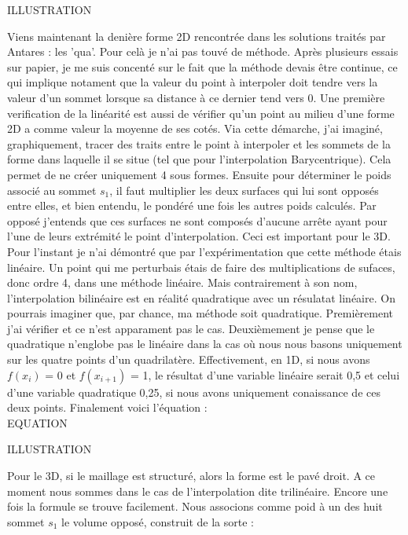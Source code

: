 ILLUSTRATION

Viens maintenant la denière forme 2D rencontrée dans les solutions traités par Antares : les 'qua'. Pour celà je n'ai pas touvé de méthode. Après plusieurs essais sur papier, je me suis concenté sur le fait que la méthode devais être continue, ce qui implique notament que la valeur du point à interpoler doit tendre vers la valeur d'un sommet lorsque sa distance à ce dernier tend vers 0. Une première verification de la linéarité est aussi de vérifier qu'un point au milieu d'une forme 2D a comme valeur la moyenne de ses cotés.
Via cette démarche, j'ai imaginé, graphiquement, tracer des traits entre le point à interpoler et les sommets de la forme dans laquelle il se situe (tel que pour l'interpolation Barycentrique). Cela permet de ne créer uniquement 4 sous formes. Ensuite pour déterminer le poids associé au sommet \( s_1 \), il faut multiplier les deux surfaces qui lui sont opposés entre elles, et bien entendu, le pondéré une fois les autres poids calculés. Par opposé j'entends que ces surfaces ne sont composés d'aucune arrête ayant pour l'une de leurs extrémité le point d'interpolation. Ceci est important pour le 3D. Pour l'instant je n'ai démontré que par l'expérimentation que cette méthode étais linéaire. Un point qui me perturbais étais de faire des multiplications de sufaces, donc ordre 4, dans une méthode linéaire. Mais contrairement à son nom, l'interpolation bilinéaire est en réalité quadratique avec un résulatat linéaire. On pourrais imaginer que, par chance, ma méthode soit quadratique. Premièrement j'ai vérifier et ce n'est apparament pas le cas. Deuxièmement je pense que le quadratique n'englobe pas le linéaire dans la cas où nous nous basons uniquement sur les quatre points d'un quadrilatère. Effectivement, en 1D, si nous avons \(f(x_i)\) = 0 et \(f(x_{i+1})\) = 1, le résultat d'une variable linéaire serait 0,5 et celui d'une variable quadratique 0,25, si nous avons uniquement conaissance de ces deux points. Finalement voici l'équation :\\
EQUATION

ILLUSTRATION\vspace{0.5cm}  %

Pour le 3D, si le maillage est structuré, alors la forme est le pavé droit. A ce moment nous sommes dans le cas de l'interpolation dite trilinéaire. Encore une fois la formule se trouve facilement. Nous associons comme poid à un des huit sommet \( s_1 \) le volume opposé, construit de la sorte :

